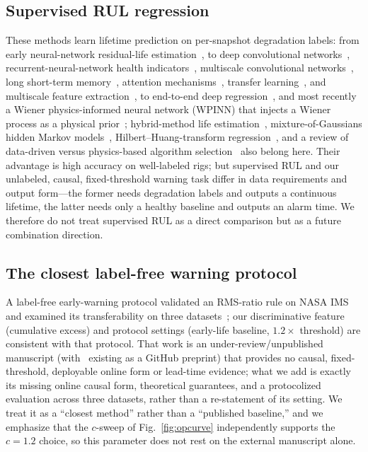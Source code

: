 \documentclass[journal]{IEEEtran}
\begin{document}
\subsection{Supervised RUL regression}
These methods learn lifetime prediction on per-snapshot degradation labels: from early neural-network residual-life estimation~\cite{gebraeel2004}, to deep convolutional networks~\cite{li2018cnn}, recurrent-neural-network health indicators~\cite{guo2017}, multiscale convolutional networks~\cite{zhu2019}, long short-term memory~\cite{zheng2017}, attention mechanisms~\cite{chen2021}, transfer learning~\cite{mao2020}, and multiscale feature extraction~\cite{li2019multiscale}, to end-to-end deep regression~\cite{deutsch2018}, and most recently a Wiener physics-informed neural network (WPINN) that injects a Wiener process as a physical prior~\cite{qiao2026}; hybrid-method life estimation~\cite{wang2020}, mixture-of-Gaussians hidden Markov models~\cite{medjaher2012}, Hilbert--Huang-transform regression~\cite{soualhi2015}, and a review of data-driven versus physics-based algorithm selection~\cite{an2015} also belong here. Their advantage is high accuracy on well-labeled rigs; but supervised RUL and our unlabeled, causal, fixed-threshold warning task differ in data requirements and output form---the former needs degradation labels and outputs a continuous lifetime, the latter needs only a healthy baseline and outputs an alarm time. We therefore do not treat supervised RUL as a direct comparison but as a future combination direction.

\subsection{The closest label-free warning protocol}
A label-free early-warning protocol validated an RMS-ratio rule on NASA IMS and examined its transferability on three datasets~\cite{hora_submitted,hora_unpublished}; our discriminative feature (cumulative excess) and protocol settings (early-life baseline, $1.2\times$ threshold) are consistent with that protocol. That work is an under-review/unpublished manuscript (with~\cite{hora_unpublished} existing as a GitHub preprint) that provides no causal, fixed-threshold, deployable online form or lead-time evidence; what we add is exactly its missing online causal form, theoretical guarantees, and a protocolized evaluation across three datasets, rather than a re-statement of its setting. We treat it as a ``closest method'' rather than a ``published baseline,'' and we emphasize that the $c$-sweep of Fig.~\ref{fig:opcurve} independently supports the $c=1.2$ choice, so this parameter does not rest on the external manuscript alone.
\end{document}
